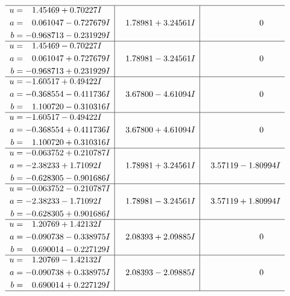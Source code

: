 \documentclass[1p]{elsarticle_modified}
\theoremstyle{definition}
\begin{document}
$$\begin{array}{c|c|c}
 \hline 
\begin{aligned}
u &= \phantom{-}1.45469 + 0.70227 I \\
a &= \phantom{-}0.061047 - 0.727679 I \\
b &= -0.968713 - 0.231929 I\end{aligned}
 & \phantom{-}1.78981 + 3.24561 I & \phantom{-0.000000 } 0 \\ \hline\begin{aligned}
u &= \phantom{-}1.45469 - 0.70227 I \\
a &= \phantom{-}0.061047 + 0.727679 I \\
b &= -0.968713 + 0.231929 I\end{aligned}
 & \phantom{-}1.78981 - 3.24561 I & \phantom{-0.000000 } 0 \\ \hline\begin{aligned}
u &= -1.60517 + 0.49422 I \\
a &= -0.368554 - 0.411736 I \\
b &= \phantom{-}1.100720 - 0.310316 I\end{aligned}
 & \phantom{-}3.67800 - 4.61094 I & \phantom{-0.000000 } 0 \\ \hline\begin{aligned}
u &= -1.60517 - 0.49422 I \\
a &= -0.368554 + 0.411736 I \\
b &= \phantom{-}1.100720 + 0.310316 I\end{aligned}
 & \phantom{-}3.67800 + 4.61094 I & \phantom{-0.000000 } 0 \\ \hline\begin{aligned}
u &= -0.063752 + 0.210787 I \\
a &= -2.38233 + 1.71092 I \\
b &= -0.628305 - 0.901686 I\end{aligned}
 & \phantom{-}1.78981 + 3.24561 I & \phantom{-}3.57119 - 1.80994 I \\ \hline\begin{aligned}
u &= -0.063752 - 0.210787 I \\
a &= -2.38233 - 1.71092 I \\
b &= -0.628305 + 0.901686 I\end{aligned}
 & \phantom{-}1.78981 - 3.24561 I & \phantom{-}3.57119 + 1.80994 I \\ \hline\begin{aligned}
u &= \phantom{-}1.20769 + 1.42132 I \\
a &= -0.090738 - 0.338975 I \\
b &= \phantom{-}0.690014 - 0.227129 I\end{aligned}
 & \phantom{-}2.08393 + 2.09885 I & \phantom{-0.000000 } 0 \\ \hline\begin{aligned}
u &= \phantom{-}1.20769 - 1.42132 I \\
a &= -0.090738 + 0.338975 I \\
b &= \phantom{-}0.690014 + 0.227129 I\end{aligned}
 & \phantom{-}2.08393 - 2.09885 I & \phantom{-0.000000 } 0\\
 \hline 
 \end{array}$$\newpage
\end{document}
